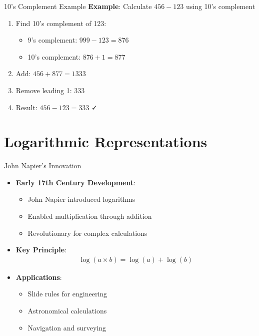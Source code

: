 \documentclass[aspectratio=169,11pt]{beamer}
\newcommand{\concept}[1]{\textbf{\color{accentcolor}#1}}
\begin{document}
\begin{frame}{10's Complement Example}
\concept{Example}: Calculate $456 - 123$ using 10's complement

\vspace{0.3cm}
\begin{enumerate}
\item Find 10's complement of 123:
\begin{itemize}
\item 9's complement: $999 - 123 = 876$
\item 10's complement: $876 + 1 = 877$
\end{itemize}

\item Add: $456 + 877 = 1333$

\item Remove leading 1: $333$

\item Result: $456 - 123 = 333$ ✓
\end{enumerate}
\end{frame}

\section{Logarithmic Representations}

\begin{frame}{John Napier's Innovation}
\begin{itemize}
\item \concept{Early 17th Century Development}:
\begin{itemize}
\item John Napier introduced logarithms
\item Enabled multiplication through addition
\item Revolutionary for complex calculations
\end{itemize}
\vspace{0.5cm}
\item \concept{Key Principle}:
\begin{align}
\log(a \times b) = \log(a) + \log(b)
\end{align}
\item \concept{Applications}:
\begin{itemize}
\item Slide rules for engineering
\item Astronomical calculations
\item Navigation and surveying
\end{itemize}
\end{itemize}
\end{frame}
\end{document}

